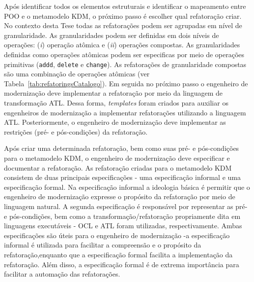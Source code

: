 Após identificar todos os elementos estruturais e identificar o mapeamento entre POO e o metamodelo KDM, o próximo passo é escolher qual refatoração criar. No contexto desta Tese todas as refatorações podem ser agrupadas em nível de granularidade. As granularidades podem ser definidas em dois níveis de operações: (\textit{i}) operação atômica e (\textit{ii}) operações compostas. As granularidades definidas como operações atômicas podem ser especificas por meio de operações primitivas (\texttt{addd}, \texttt{delete} e \texttt{change}). As refatorações de granularidade compostas são uma combinação de operações atômicas (ver Tabela~\ref{tab:refatoringsCatalogo}). Em seguida no próximo passo o engenheiro de modernização deve implementar a refatoração por meio da linguagem de transformação ATL. Dessa forma, \textit{templates} foram criados para auxiliar os engenheiros de modernização a implementar refatorações utilizando a linguagem ATL. Posteriormente, o engenheiro de modernização deve implementar as restrições (pré- e pós-condições) da refatoração.

Após criar uma determinada refatoração, bem como suas pré- e pós-condições para o metamodelo KDM, o engenheiro de modernização deve especificar e documentar a refatoração. As refatoração criadas para o metamodelo KDM consistem de duas principais especificações - uma especificação informal e uma especificação formal. Na especificação informal a ideologia básica é permitir que o engenheiro de modernização expresse o propósito da refatoração por meio de linguagem natural. A segunda especificação é responsável por representar as pré- e pós-condições, bem como a transformação/refatoração propriamente dita em linguagens executáveis - OCL e ATL foram utilizadas, respectivamente. Ambas especificações são úteis para o engenheiro de modernização -a especificação informal é utilizada para facilitar a compreensão e o propósito da refatoração,enquanto que a especificação formal facilita a implementação da refatoração. Além disso, a especificação formal é de extrema importância para facilitar a automação das refatorações. %


